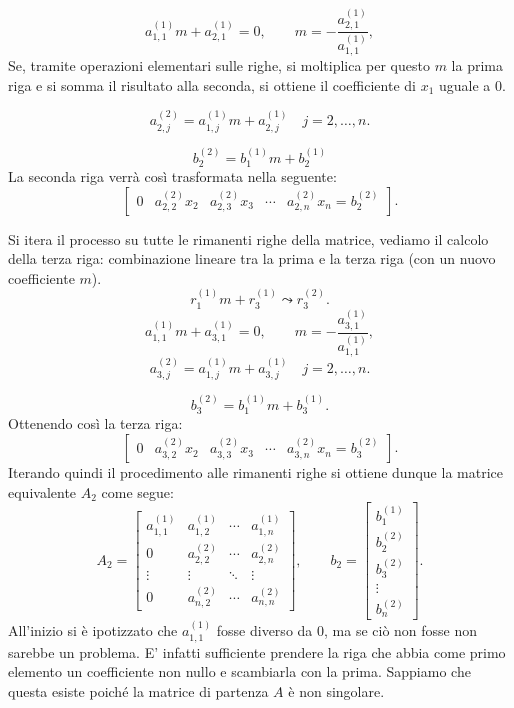 \[
a_{1,1}^{(1)}m + a_{2,1}^{(1)} = 0, \qquad m = -\frac{a_{2,1}^{(1)}}{a_{1,1}^{(1)}},
\]
Se, tramite operazioni elementari sulle righe, si moltiplica per
questo $m$ la prima riga e si somma il risultato alla seconda, si ottiene il
coefficiente di $x_1$ uguale a $0$.

\[
a_{2,j}^{(2)} = a_{1,j}^{(1)}m + a_{2,j}^{(1)} \quad j = 2, \ldots, n.
\]

\[
b_2^{(2)} = b_1^{(1)}m + b_2^{(1)}
\]
La seconda riga verrà così trasformata nella seguente:
\[\left[
\begin{array}{ccccc}
0 & a_{2,2}^{(2)}x_2 & a_{2,3}^{(2)}x_3 & \cdots & a_{2,n}^{(2)}x_n = b_2^{(2)}
\end{array}\right].
\]

Si itera il processo su tutte le rimanenti righe della matrice, vediamo
il calcolo della terza riga: combinazione lineare tra la prima e la terza
riga (con un nuovo coefficiente $m$).
\[
r_1^{(1)}m + r_3^{(1)} \leadsto r_3^{(2)}.
\]
\[
a_{1,1}^{(1)}m + a_{3,1}^{(1)} = 0, \qquad m = -\frac{a_{3,1}^{(1)}}{a_{1,1}^{(1)}},
\]
\[
a_{3,j}^{(2)} = a_{1,j}^{(1)}m + a_{3,j}^{(1)} \quad j = 2, \ldots, n.
\]

\[
b_3^{(2)} = b_1^{(1)}m + b_3^{(1)}.
\]
Ottenendo così la terza riga:
\[ \left[
\begin{array}{ccccc}
0 & a_{3,2}^{(2)}x_2 & a_{3,3}^{(2)}x_3 & \cdots & a_{3,n}^{(2)}x_n = b_3^{(2)}
\end{array}
\right].
\]
Iterando quindi il procedimento alle rimanenti righe si ottiene dunque la
matrice equivalente $A_2$ come segue:
\[
A_2 = \left[
\begin{array}{cccc}
a_{1,1}^{(1)} & a_{1,2}^{(1)} & \cdots & a_{1,n}^{(1)} \\
0 & a_{2,2}^{(2)} & \cdots & a_{2,n}^{(2)} \\
\vdots & \vdots & \ddots & \vdots \\
0 & a_{n,2}^{(2)} & \cdots & a_{n,n}^{(2)}
\end{array} \right],
\qquad
b_2 = \left[ \begin{array}{c}
b_{1}^{(1)} \\
b_2^{(2)} \\
b_3^{(2)} \\
\vdots \\
b_{n}^{(2)}
\end{array}\right].
\]
All'inizio si è ipotizzato che $a_{1,1}^{(1)}$ fosse diverso da $0$, ma se
ciò non fosse non sarebbe un problema. E' infatti sufficiente prendere la riga
che abbia come primo elemento un coefficiente non nullo e scambiarla con la
prima. Sappiamo che questa esiste poiché la matrice di partenza $A$ è non
singolare.

